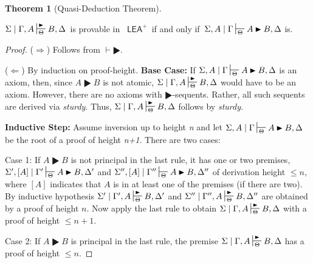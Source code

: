 \documentclass{article}
\theoremstyle{definition}
\newtheorem{theorem}{Theorem}
\theoremstyle{definition}
\theoremstyle{definition}
\theoremstyle{definition}
\theoremstyle{remark}
\theoremstyle{definition}
\theoremstyle{definition}
\begin{document}
\begin{theorem}[Quasi-Deduction Theorem]\label{quasideduct}
	
	$\Sigma\mid\Gamma, A\sststile{\Theta}{\RHD}B,\Delta $\, is provable in \, $ \mathsf{LEA^+}$\, if and only if \,$  \Sigma, A\mid\Gamma\sststile{\Theta}{} A \RHD B, \Delta  $ is.
	
	\begin{proof}
		($ \Rightarrow$) Follows from $ \vdash\RHD $.
		
		($ \Leftarrow $) By induction on proof-height. 
		\textbf{Base Case:} If $ \Sigma, A\mid\Gamma\sststile{\Theta}{} A \RHD B, \Delta  $ is an axiom, then, since $ A \RHD B $ is not atomic, $\Sigma\mid\Gamma, A\sststile{\Theta}{\RHD}B,\Delta $ would have to be an axiom. However, there are no axioms with $ \RHD $-sequents. Rather, all such sequents are derived via \textit{sturdy}. Thus, $\Sigma\mid\Gamma, A\sststile{\Theta}{\RHD}B,\Delta $ follows by \textit{sturdy}. 
		
		\textbf{Inductive Step:} Assume inversion up to height \textit{n} and let $ \Sigma, A\mid\Gamma\sststile{\Theta}{} A \RHD B, \Delta  $ be the root of a proof of height \textit{n+1}. There are two cases:
		
		Case 1: If $  A \RHD B $ is not principal in the last rule, it has one or two premises, $ \Sigma', [A]\mid\Gamma'\sststile{\Theta}{} A \RHD B, \Delta'  $ and $ \Sigma'', [A]\mid\Gamma''\sststile{\Theta}{} A \RHD B, \Delta''  $ of derivation height $ \leq n $, where $ [A] $ indicates that $ A $ is in at least one of the premises (if there are two). By inductive hypothesis $\Sigma'\mid\Gamma', A\sststile{\Theta}{\RHD}B,\Delta' $ and $\Sigma''\mid\Gamma'', A\sststile{\Theta}{\RHD}B,\Delta'' $ are obtained by a proof of height $ n $. Now apply the last rule to obtain $\Sigma\mid\Gamma, A\sststile{\Theta}{\RHD}B,\Delta $ with a proof of height $ \leq n+1 $.
		
		Case 2: If $  A \RHD B$ is principal in the last rule, the premise $\Sigma\mid\Gamma, A\sststile{\Theta}{\RHD}B,\Delta $ has a proof of height $ \leq n $.
	\end{proof}
	
	
\end{theorem}
\end{document}
